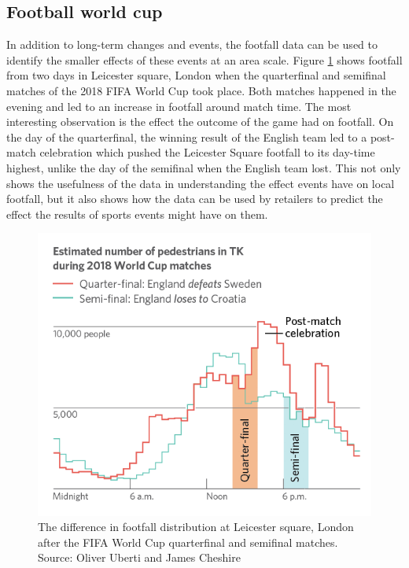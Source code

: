 \subsection{Football world cup}
In addition to long-term changes and events, the footfall data can be used to identify the smaller effects of these events at an area scale.
Figure \ref{figure:applications:football} shows footfall from two days in Leicester square, London when the quarterfinal and semifinal matches of the 2018 FIFA World Cup took place. 
Both matches happened in the evening and led to an  increase in footfall around match time. 
The most interesting observation is the effect the outcome of the game had on footfall. 
On the day of the quarterfinal, the winning result of the English team led to a post-match celebration which pushed the Leicester Square footfall to its day-time highest, unlike the day of the semifinal when the English team lost. 
This not only shows the usefulness of the data in understanding the effect events have on local footfall, but it also shows how the data can be used by retailers to predict the effect the results of sports events might have on them.

\begin{figure}
  \includegraphics[trim={0 24 0 70},clip]{images/applications-football-sample.png}
  \caption{The difference in footfall distribution at Leicester square, London after the FIFA World Cup quarterfinal and semifinal matches. Source: Oliver Uberti and James Cheshire }
  \label{figure:applications:football}
\end{figure}

